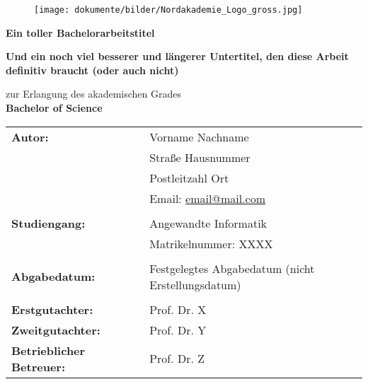 \thispagestyle{empty}

\vspace{1.5cm}

\begin{figure}[h]
    \centering
    \texttt{[image: dokumente/bilder/Nordakademie\_Logo\_gross.jpg]}
\end{figure}

\vspace{2.5cm}

\begin{center}
    {\Huge \textbf{Ein toller Bachelorarbeitstitel}}

    \textbf{\Large{Und ein noch viel besserer und längerer Untertitel, den diese Arbeit definitiv braucht (oder auch nicht)}}
\end{center}

\vspace{1.5cm}

\begin{center}
    zur Erlangung des akademischen Grades\\
    \textbf{\large{Bachelor of Science}}
\end{center}

\vspace{4.0cm}

\begin{flushleft}
    \begin{tabular}{llll}
        \textbf{Autor:} & & Vorname Nachname & \\
        & & Straße Hausnummer & \\
        & & Postleitzahl Ort & \\
        & & Email: \href{mailto:email@mail.com}{email@mail.com} & \\
        & & \\
        \textbf{Studiengang:} & & Angewandte Informatik & \\
        & & Matrikelnummer: XXXX & \\ 
        & & \\
        \textbf{Abgabedatum:} & & Festgelegtes Abgabedatum (nicht Erstellungsdatum) &\\
        & & \\
        \textbf{Erstgutachter:} & & Prof. Dr. X &\\
        \textbf{Zweitgutachter:} & & Prof. Dr. Y &\\
        \textbf{Betrieblicher Betreuer:} & & Prof. Dr. Z &\\
    \end{tabular}
\end{flushleft}

\pagebreak
